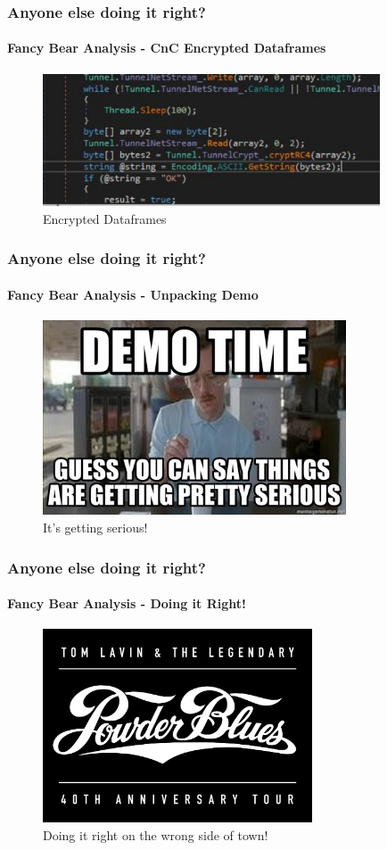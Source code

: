 \documentclass[aspectratio=169]{beamer}
\begin{document}
\begin{frame}
  \frametitle{Anyone else doing it right?}
  \framesubtitle{Fancy Bear Analysis - CnC Encrypted Dataframes}
  \begin{center}
    \begin{figure}
      \includegraphics[width=10cm,keepaspectratio]{fancy_bear_analysis_9}
      \caption{Encrypted Dataframes}
    \end{figure}
  \end{center}
\end{frame}

\begin{frame}
  \frametitle{Anyone else doing it right?}
  \framesubtitle{Fancy Bear Analysis - Unpacking Demo}
  \begin{center}
    \begin{figure}
      \includegraphics[width=9cm,keepaspectratio]{demo_serious}
      \caption{It's getting serious!}
    \end{figure}
  \end{center}
\end{frame}

\begin{frame}
  \frametitle{Anyone else doing it right?}
  \framesubtitle{Fancy Bear Analysis - Doing it Right!}
  \begin{center}
    \begin{figure}
      \includegraphics[width=8cm,keepaspectratio]{powder_blues}
      \caption{Doing it right on the wrong side of town!}
    \end{figure}
  \end{center}
\end{frame}
\end{document}
